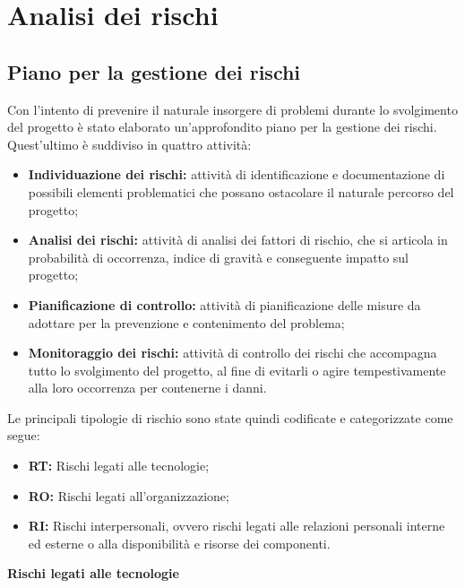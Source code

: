 \chapter{Analisi dei rischi}

\section{Piano per la gestione dei rischi}
Con l'intento di prevenire il naturale insorgere di problemi durante lo svolgimento del progetto è stato elaborato un'approfondito piano per la gestione dei rischi. Quest'ultimo è suddiviso in quattro attività:
\begin{itemize}
  \item \textbf{Individuazione dei rischi:} attività di identificazione e documentazione di possibili elementi problematici che possano ostacolare il naturale percorso del progetto;
  \item \textbf{Analisi dei rischi:} attività di analisi dei fattori di rischio, che si articola in probabilità di occorrenza, indice di gravità e conseguente impatto sul progetto;
  \item \textbf{Pianificazione di controllo:} attività di pianificazione delle misure da adottare per la prevenzione e contenimento del problema;
  \item \textbf{Monitoraggio dei rischi:} attività di controllo dei rischi che accompagna tutto lo svolgimento del progetto, al fine di evitarli o agire tempestivamente alla loro occorrenza per contenerne i danni.
\end{itemize}
Le principali tipologie di rischio sono state quindi codificate e categorizzate come segue:
\begin{itemize}
  \item \textbf{RT:} Rischi legati alle tecnologie;
  \item \textbf{RO:} Rischi legati all'organizzazione;
  \item \textbf{RI:} Rischi interpersonali, ovvero rischi legati alle relazioni personali interne ed esterne o alla disponibilità e risorse dei componenti.
\end{itemize}

\quad
\begin{center}
	\LARGE\textbf{Rischi legati alle tecnologie}
\end{center}

